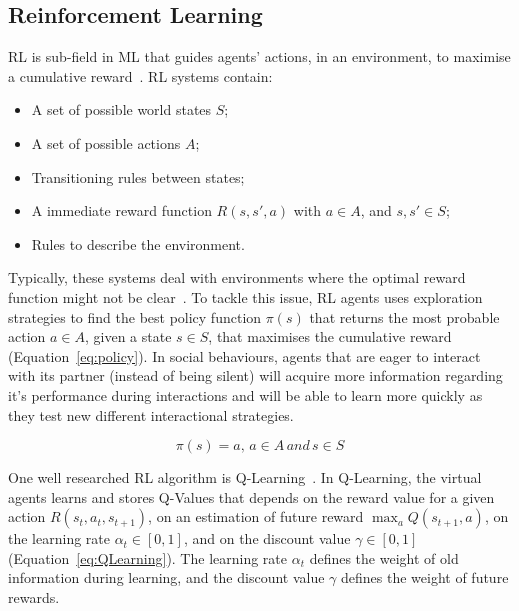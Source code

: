 \subsection{Reinforcement Learning}
\label{subsec:ReinforcementLearning}

\acf{RL} is sub-field in \ac{ML} that guides agents' actions, in an environment, to maximise a cumulative reward~\cite{Sutton:1998:IRL:551283, Dayan1992}. \ac{RL} systems contain:

\begin{itemize}
	\item A set of possible world states $S$;
	\item A set of possible actions $A$;
	\item Transitioning rules between states;
	\item A immediate reward function $R(s,s',a)$ with $a \in A$, and $s,s' \in S$;
	\item Rules to describe the environment.
\end{itemize}

Typically, these systems deal with environments where the optimal reward function might not be clear~\cite{Sutton:1998:IRL:551283}. To tackle this issue, \ac{RL} agents uses exploration strategies to find the best policy function $\pi(s)$ that returns the most probable action $a \in A$, given a state $s \in S$, that maximises the cumulative reward (Equation~\ref{eq:policy}). In social behaviours, agents that are eager to interact with its partner (instead of being silent) will acquire more information regarding it's performance during interactions and will be able to learn more quickly as they test new different interactional strategies.

\vspace{-3mm}
\begin{equation}
	\pi(s) = a,\,a \in A\, and\,s \in S
	\label{eq:policy}
\end{equation}

One well researched \ac{RL} algorithm is Q-Learning~\cite{Dayan1992}. In Q-Learning, the virtual agents learns and stores Q-Values that depends on the reward value for a given action $R(s_t,a_t,s_{t+1})$, on an estimation of future reward $\max_{a}Q(s_{t+1},a)$, on the learning rate $\alpha_t \in {[0,1]}$, and on the discount value $\gamma \in {[0,1]}$ (Equation~\ref{eq:QLearning}). The learning rate $\alpha_t$ defines the weight of old information during learning, and the discount value $\gamma$ defines the weight of future rewards.

